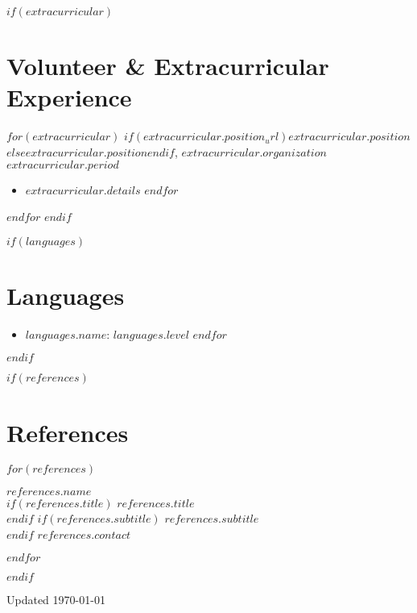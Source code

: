 \documentclass[10.5pt,a4paper]{article}
\newcommand{\daterange}[1]{\textbf{#1}}
\newenvironment{entryDetails}
  {%
    \begin{itemize}[leftmargin=2.5em, rightmargin=2.5em, itemsep=0.5pt, topsep=1pt, parsep=0pt]
  }
  {%
    \end{itemize}
    \vspace{-0.1cm}
  }
\begin{document}
$if(extracurricular)$
\section*{Volunteer \& Extracurricular Experience}
$for(extracurricular)$
\noindent\textbf{$if(extracurricular.position_url)$\href{$extracurricular.position_url$}{$extracurricular.position$}$else$$extracurricular.position$$endif$}, $extracurricular.organization$ \hfill \daterange{$extracurricular.period$}
\begin{entryDetails}
	$for(extracurricular.details)$
	\item $extracurricular.details$
	$endfor$
\end{entryDetails}
$endfor$
$endif$

$if(languages)$
\section*{Languages}
\begin{entryDetails}
	$for(languages)$
	\item \textbf{$languages.name$}: $languages.level$
	$endfor$
\end{entryDetails}
$endif$

$if(references)$
\section*{References}
\begin{multicols}{3}
	\raggedcolumns
	$for(references)$
	\noindent
	\begin{minipage}[t]{\linewidth}
		\textbf{$references.name$}\\
		$if(references.title)$%
		\textit{$references.title$}\\
		$endif$%
		$if(references.subtitle)$%
		\textit{$references.subtitle$}\\
		$endif$%
		\href{mailto:$references.contact$}{$references.contact$}%
	\end{minipage}\par
	\vspace{4pt}
	$endfor$
\end{multicols}
$endif$

\vfill
\begin{center}
	\footnotesize{Updated \today}
\end{center}
\end{document}
